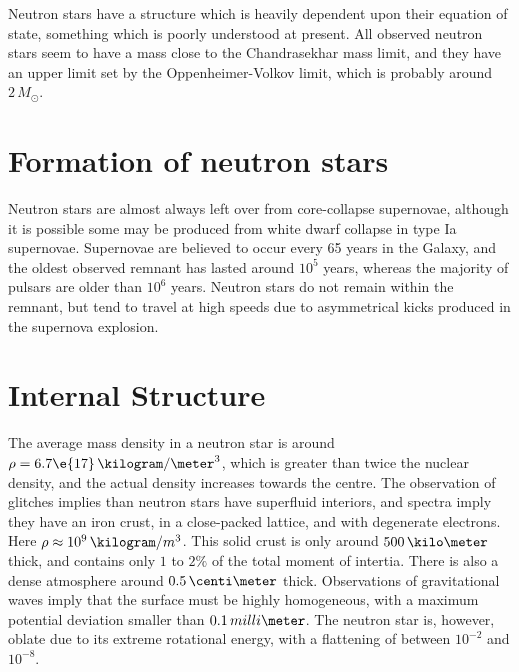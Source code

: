 Neutron stars have a structure which is heavily dependent upon their
equation of state, something which is poorly understood at
present. All observed neutron stars seem to have a mass close to the
Chandrasekhar mass limit, and they have an upper limit set by the
Oppenheimer-Volkov limit, which is probably around $2\,M_{\odot}$.

\section{Formation of neutron stars}
\label{sec:form-neutr-stars}

Neutron stars are almost always left over from core-collapse
supernovae, although it is possible some may be produced from white
dwarf collapse in type Ia supernovae. Supernovae are believed to occur
every 65 years in the Galaxy, and the oldest observed remnant has
lasted around $10^5$ years, whereas the majority of pulsars are older
than $10^6$ years. Neutron stars do not remain within the remnant, but
tend to travel at high speeds due to asymmetrical kicks produced in
the supernova explosion.

\section{Internal Structure}
\label{sec:internal-structure}



The average mass density in a neutron star is around $\rho =
6.7\e{17}\,\kilogram/\meter^3$, which is greater than twice the
nuclear density, and the actual density increases towards the
centre. The observation of glitches implies than neutron stars have
superfluid interiors, and spectra imply they have an iron crust, in a
close-packed lattice, and with degenerate electrons. Here $\rho\approx
10^9\,\kilogram/m^3$. This solid crust is only around
$500\,\kilo\meter$ thick, and contains only $1$ to $2\%$ of the total
moment of intertia. There is also a dense atmosphere around
$0.5\,\centi\meter$ thick. Observations of gravitational waves imply
that the surface must be highly homogeneous, with a maximum potential
deviation smaller than $0.1\,milli\meter$. The neutron star is,
however, oblate due to its extreme rotational energy, with a
flattening of between $10^{-2}$ and $10^{-8}$.

